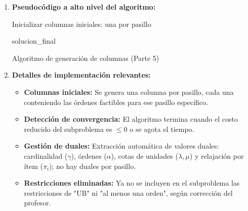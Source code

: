 \documentclass[a4paper,12pt]{article}
\begin{document}
\begin{enumerate}[label=(\alph*), leftmargin=2em]
    \item \textbf{Pseudocódigo a alto nivel del algoritmo:}

    \begin{algorithm}[H]
    
    Inicializar columnas iniciales: una por pasillo\;
    
    \Return solucion\_final\;
    
    \caption{Algoritmo de generación de columnas (Parte 5)}
    \end{algorithm}

    \item \textbf{Detalles de implementación relevantes:}
    
    \begin{itemize}
        \item \textbf{Columnas iniciales:} Se genera una columna por pasillo, cada una conteniendo las órdenes factibles para ese pasillo específico.
        \item \textbf{Detección de convergencia:} El algoritmo termina cuando el costo reducido del subproblema es $\leq 0$ o se agota el tiempo.
    \item \textbf{Gestión de duales:} Extracción automática de valores duales: cardinalidad ($\gamma$), órdenes ($\alpha$), cotas de unidades ($\lambda,\mu$) y relajación por ítem ($\pi_i$); no hay duales por pasillo.
    \item \textbf{Restricciones eliminadas:} Ya no se incluyen en el subproblema las restricciones de "UB" ni "al menos una orden", según corrección del profesor.
    \end{itemize}

\end{enumerate}
\end{document}
